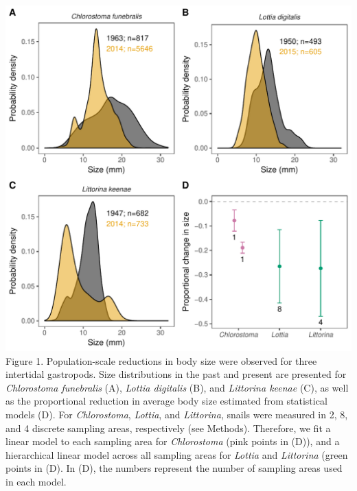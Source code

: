 \documentclass[11pt,]{article}
\begin{document}
\includegraphics{../../figs_ms/plot_size_frequncy_density_4panel.pdf}
Figure 1. Population-scale reductions in body size were observed for
three intertidal gastropods. Size distributions in the past and present
are presented for \emph{Chlorostoma funebralis} (A), \emph{Lottia
digitalis} (B), and \emph{Littorina keenae} (C), as well as the
proportional reduction in average body size estimated from statistical
models (D). For \emph{Chlorostoma}, \emph{Lottia}, and \emph{Littorina},
snails were measured in 2, 8, and 4 discrete sampling areas,
respectively (see Methods). Therefore, we fit a linear model to each
sampling area for \emph{Chlorostoma} (pink points in (D)), and a
hierarchical linear model across all sampling areas for \emph{Lottia}
and \emph{Littorina} (green points in (D). In (D), the numbers represent
the number of sampling areas used in each model.

\newpage  
\end{document}
